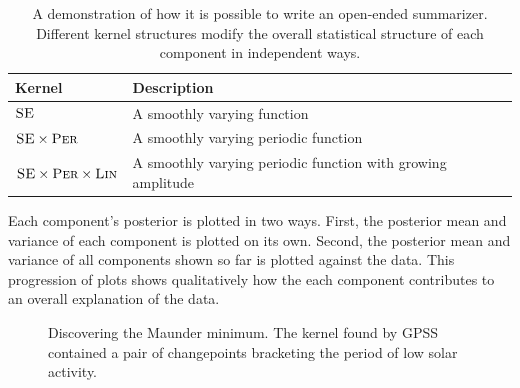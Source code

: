 \documentclass{article} %
\begin{document}
\begin{table}
\begin{tabular}{l|l}
Kernel & Description \\
\midrule
${\textsc{SE}}$ & A smoothly varying function \\
${\textsc{SE}} \times {\textsc{Per}}$ & A smoothly varying periodic function \\
${\textsc{SE}} \times {\textsc{Per}} \times {\textsc{Lin}}$ & A smoothly varying periodic function with growing amplitude \\
\end{tabular}
\caption{A demonstration of how it is possible to write an open-ended summarizer.  Different kernel structures modify the overall statistical structure of each component in independent ways.}
\label{table:descriptions}
\end{table}


Each component's posterior is plotted in two ways.  First, the posterior mean and variance of each component is plotted on its own.  Second, the posterior mean and variance of all components shown so far is plotted against the data.  This progression of plots 
shows qualitatively how the each component contributes to an overall explanation of the data.

\begin{figure}[h!]
\centering
{}
\caption{Discovering the Maunder minimum.  The kernel found by GPSS contained a pair of changepoints bracketing the period of low solar activity.}
\label{fig:maunder}
\end{figure}
\end{document}
